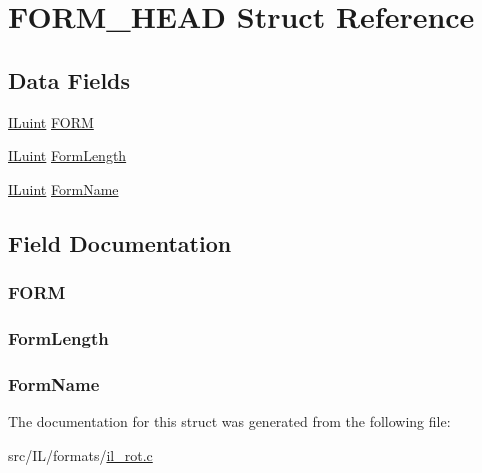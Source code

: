 \hypertarget{struct_f_o_r_m___h_e_a_d}{\section{F\-O\-R\-M\-\_\-\-H\-E\-A\-D Struct Reference}
\label{struct_f_o_r_m___h_e_a_d}
}
\subsection*{Data Fields}
\begin{DoxyCompactItemize}
\item 
\hyperlink{il_8h_ac6508d0e9c19e32f32e00d54b5b8cf30}{I\-Luint} \hyperlink{struct_f_o_r_m___h_e_a_d_a2dc2ee09bc266c72f8ee52d07378acea}{F\-O\-R\-M}
\item 
\hyperlink{il_8h_ac6508d0e9c19e32f32e00d54b5b8cf30}{I\-Luint} \hyperlink{struct_f_o_r_m___h_e_a_d_a18dac4c0e59ff880b3bb02a37cba5650}{Form\-Length}
\item 
\hyperlink{il_8h_ac6508d0e9c19e32f32e00d54b5b8cf30}{I\-Luint} \hyperlink{struct_f_o_r_m___h_e_a_d_a4185052f01019a6bb3ef8b4d86a08fb0}{Form\-Name}
\end{DoxyCompactItemize}


\subsection{Field Documentation}
\hypertarget{struct_f_o_r_m___h_e_a_d_a2dc2ee09bc266c72f8ee52d07378acea}{
\subsubsection[{F\-O\-R\-M}]{ F\-O\-R\-M}}\label{struct_f_o_r_m___h_e_a_d_a2dc2ee09bc266c72f8ee52d07378acea}
\hypertarget{struct_f_o_r_m___h_e_a_d_a18dac4c0e59ff880b3bb02a37cba5650}{
\subsubsection[{Form\-Length}]{ Form\-Length}}\label{struct_f_o_r_m___h_e_a_d_a18dac4c0e59ff880b3bb02a37cba5650}
\hypertarget{struct_f_o_r_m___h_e_a_d_a4185052f01019a6bb3ef8b4d86a08fb0}{
\subsubsection[{Form\-Name}]{ Form\-Name}}\label{struct_f_o_r_m___h_e_a_d_a4185052f01019a6bb3ef8b4d86a08fb0}


The documentation for this struct was generated from the following file\-:\begin{DoxyCompactItemize}
\item 
src/\-I\-L/formats/\hyperlink{il__rot_8c}{il\-\_\-rot.\-c}\end{DoxyCompactItemize}
